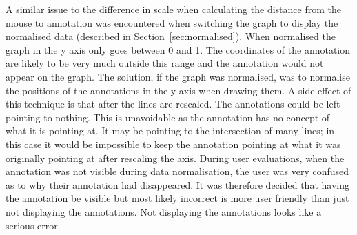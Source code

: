 A similar issue to the difference in scale when calculating the distance from the mouse to annotation was encountered when switching the graph to display the normalised data (described in Section~\ref{sec:normalised}).  When normalised the graph in the y axis only goes between 0 and 1.  The coordinates of the annotation are likely to be very much outside this range and the annotation would not appear on the graph.  The solution, if the graph was normalised, was to normalise the positions of the annotations in the y axis when drawing them.  A side effect of this technique is that after the lines are rescaled.  The annotations could be left pointing to nothing.  This is unavoidable as the annotation has no concept of what it is pointing at.  It may be pointing to the intersection of many lines; in this case it would be impossible to keep the annotation pointing at what it was originally pointing at after rescaling the axis.  During user evaluations, when the annotation was not visible during data normalisation, the user was very confused as to why their annotation had disappeared.  It was therefore decided that having the annotation be visible but most likely incorrect is more user friendly than just not displaying the annotations.  Not displaying the annotations looks like a serious error.

